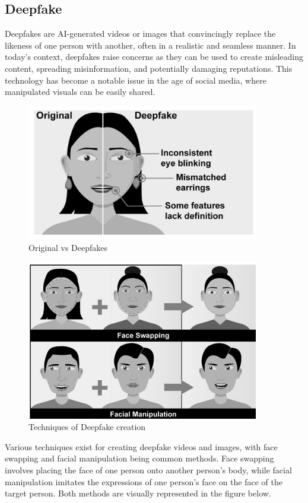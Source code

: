 
\subsection{Deepfake}
Deepfakes are AI-generated videos or images that convincingly replace the likeness of one person with another, often in a realistic and seamless manner. In today's context, deepfakes raise concerns as they can be used to create misleading content, spreading misinformation, and potentially damaging reputations. This technology has become a notable issue in the age of social media, where manipulated visuals can be easily shared.\\
\begin{figure}[htbp]
    \centering
    \includegraphics[width=4in]{img/deefakeface.png}
    \caption{{Original vs Deepfakes }}
\end{figure}


\begin{figure}[htbp]
    \centering
    \includegraphics[width=4in]{img/face manipulation.png}
    \caption{{Techniques of Deepfake creation}}
\end{figure}
\noindent Various techniques exist for creating deepfake videos and images, with face swapping and facial manipulation being common methods. Face swapping involves placing the face of one person onto another person's body, while facial manipulation imitates the expressions of one person's face on the face of the target person. Both methods are visually represented in the figure below.\\



